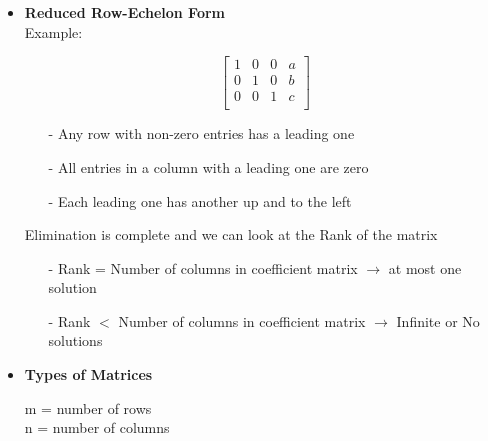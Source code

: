 \documentclass[12pt]{article}
\begin{document}
\begin{flushleft}
\begin{itemize}
		\newpage
			\item \textbf{Reduced Row-Echelon Form}\\
			Example:
			
			$$\begin{bmatrix}
				1 & 0 & 0  & a\\
				0 & 1 & 0 & b\\
				0 & 0 & 1 & c\\
			\end{bmatrix}$$
			
			\begin{itemize}
				\item[-] Any row with non-zero entries has a leading one
				\item[-] All entries in a column with a leading one are zero
				\item[-] Each leading one has another up and to the left
			\end{itemize}
		Elimination is complete and we can look at the Rank of the matrix
	
	\begin{center}
		 \par 
	\end{center}

\begin{itemize}
	\item[-] Rank = Number of columns in coefficient matrix $\rightarrow$ at most one solution
	\item[-] Rank $<$ Number of columns in coefficient matrix $\rightarrow$ Infinite or No solutions
\end{itemize}
		
		
\item \textbf{Types of Matrices}
\begin{center}
	 m = number of rows\\
	 n = number of columns \\
	 

\end{center}
\end{itemize}
\end{flushleft}
\end{document}
